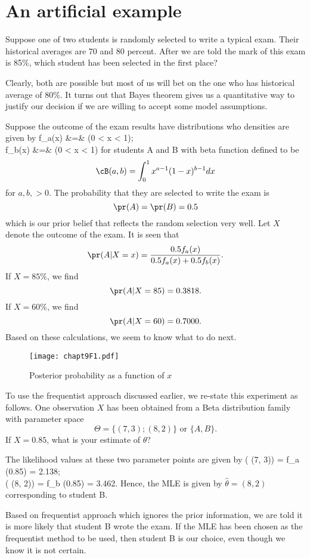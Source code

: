 \section{An artificial example}
Suppose one of two students is randomly selected to write a typical
exam. Their historical averages are 70 and 80 percent. After we are
told the mark of this exam is 85\%, which student has been selected
in the first place? 

Clearly, both are possible but most of us will bet on the one who has historical
average of 80\%. It turns out that Bayes theorem gives us a quantitative
way to justify our decision if we are willing to accept some model
assumptions.

Suppose the outcome of the exam results have distributions
who densities are given by
\bea
f_a(x) &=&  \ind(0 < x < 1); \\
f_b(x) &=&  \ind(0 < x < 1)
\eea
for students A and B with beta function defined to be
\[
\cB(a, b) = \int_0^1 x^{a-1}(1-x)^{b-1}dx
\]
for $a, b, > 0$. 
The probability that they are selected
to write the exam is
\[
\pr(A) = \pr(B) = 0.5
\]
which is our prior belief that reflects the random selection very well.
Let $X$ denote the outcome of the exam.
It is seen that
\[
\pr(A | X=x)
=
\frac{0.5 f_a(x)}{0.5 f_a(x)+ 0.5 f_b(x)}.
\]
If $X = 85\%$, we find
\[
\pr(A | X=85)
= 0.3818.
\]
If $X=60\%$, we find
\[
\pr(A | X=60)
= 0.7000.
\]
Based on these calculations, we seem to know what to do next.

\begin{figure}
\caption{Posterior probability as a function of $x$}
\centerline{ \texttt{[image: chapt9F1.pdf]}}
\label{chapt9F1}
\end{figure}


To use the frequentist approach discussed earlier, we re-state
this experiment as follows. One observation $X$ has been obtained
from a Beta distribution family with parameter space
\[
\Theta = \{(7, 3); (8, 2)\} {\mbox{ or }} \{A, B\}.
\]
If $X=0.85$, what is your estimate of $\theta$?

The likelihood values at these two parameter points
are given by
\bea
\ell( (7, 3)) = f_a (0.85) =  2.138;\\
\ell( (8, 2)) = f_b (0.85) =  3.462.
\eea
Hence, the MLE is given by $\hat \theta = (8, 2)$ corresponding
to student B.

Based on frequentist approach which ignores the prior information,
we are told it is more likely that student B wrote the exam.
If the MLE has been chosen as the frequentist method to be
used, then student B is our choice, even though we know it is
not certain.

